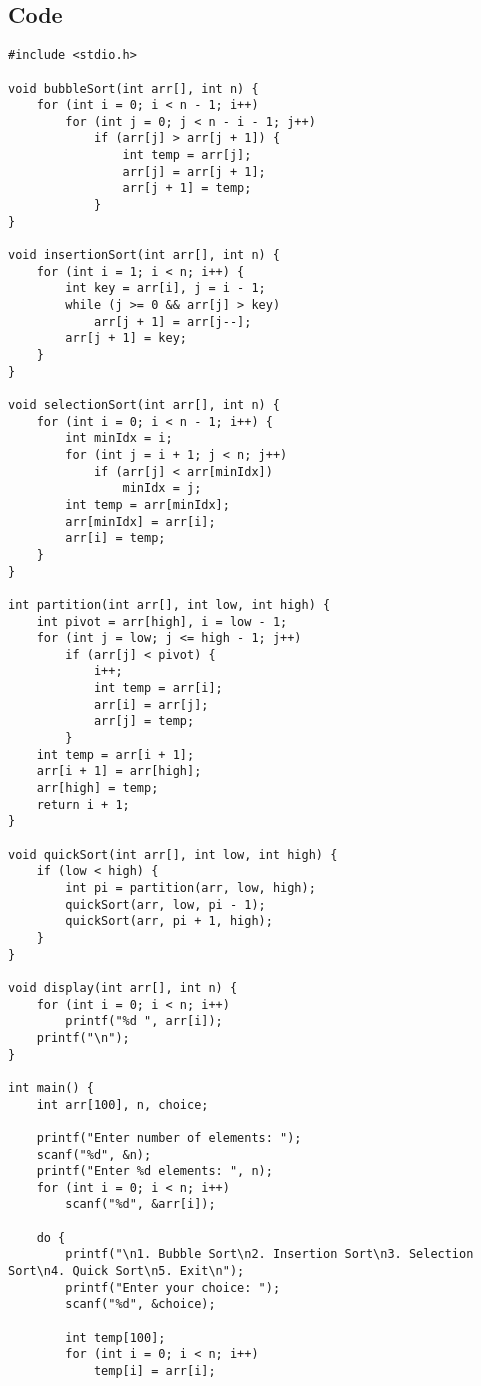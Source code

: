 \documentclass[12pt,a4paper]{article}
\begin{document}
\subsection*{Code}
\begin{lstlisting}
#include <stdio.h>

void bubbleSort(int arr[], int n) {
    for (int i = 0; i < n - 1; i++)
        for (int j = 0; j < n - i - 1; j++)
            if (arr[j] > arr[j + 1]) {
                int temp = arr[j];
                arr[j] = arr[j + 1];
                arr[j + 1] = temp;
            }
}

void insertionSort(int arr[], int n) {
    for (int i = 1; i < n; i++) {
        int key = arr[i], j = i - 1;
        while (j >= 0 && arr[j] > key)
            arr[j + 1] = arr[j--];
        arr[j + 1] = key;
    }
}

void selectionSort(int arr[], int n) {
    for (int i = 0; i < n - 1; i++) {
        int minIdx = i;
        for (int j = i + 1; j < n; j++)
            if (arr[j] < arr[minIdx])
                minIdx = j;
        int temp = arr[minIdx];
        arr[minIdx] = arr[i];
        arr[i] = temp;
    }
}

int partition(int arr[], int low, int high) {
    int pivot = arr[high], i = low - 1;
    for (int j = low; j <= high - 1; j++)
        if (arr[j] < pivot) {
            i++;
            int temp = arr[i];
            arr[i] = arr[j];
            arr[j] = temp;
        }
    int temp = arr[i + 1];
    arr[i + 1] = arr[high];
    arr[high] = temp;
    return i + 1;
}

void quickSort(int arr[], int low, int high) {
    if (low < high) {
        int pi = partition(arr, low, high);
        quickSort(arr, low, pi - 1);
        quickSort(arr, pi + 1, high);
    }
}

void display(int arr[], int n) {
    for (int i = 0; i < n; i++)
        printf("%d ", arr[i]);
    printf("\n");
}

int main() {
    int arr[100], n, choice;

    printf("Enter number of elements: ");
    scanf("%d", &n);
    printf("Enter %d elements: ", n);
    for (int i = 0; i < n; i++)
        scanf("%d", &arr[i]);

    do {
        printf("\n1. Bubble Sort\n2. Insertion Sort\n3. Selection Sort\n4. Quick Sort\n5. Exit\n");
        printf("Enter your choice: ");
        scanf("%d", &choice);

        int temp[100];
        for (int i = 0; i < n; i++)
            temp[i] = arr[i];


\end{lstlisting}
\end{document}

